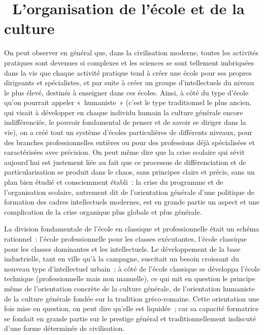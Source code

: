 \documentclass[french,twoside]{book} %
\begin{document}
\section[{ L'organisation de l’école et de la culture}]{ L'organisation de l’école et de la culture}
\noindent On peut observer en général que, dans la civilisation moderne, toutes les activités pratiques sont devenues si complexes et les sciences se sont tellement imbriquées dans la vie que chaque activité pratique tend à créer une école pour ses propres dirigeants et spécialistes, et par suite à créer un groupe d’intellectuels du niveau le plus élevé, destinés à enseigner dans ces écoles. Ainsi, à côté du type d’école qu’on pourrait appeler « humaniste » (c’est le type traditionnel le plus ancien, qui visait à développer en chaque individu humain la culture générale encore indifférenciée, le pouvoir fondamental de penser et de savoir se diriger dans la vie), on a créé tout un système d’écoles particulières de différents niveaux, pour des branches professionnelles entières ou pour des professions déjà spécialisées et caractérisées avec précision. On peut même dire que la crise scolaire qui sévit aujourd’hui est justement liée au fait que ce processus de différenciation et de particularisation se produit dans le chaos, sans principes clairs et précis, sans un plan bien étudié et consciemment établi : la crise du programme et de l’organisation scolaire, autrement dit de l’orientation générale d’une politique de formation des cadres intellectuels modernes, est en grande partie un aspect et une complication de la crise organique plus globale et plus générale.\par
La division fondamentale de l’école en classique et professionnelle était un schéma rationnel : l’école professionnelle pour les classes exécutantes, l’école classique pour les classes dominantes et les intellectuels. Le développement de la base industrielle, tant en ville qu’à la campagne, suscitait un besoin croissant du nouveau type d’intellectuel urbain ; à côté de l’école classique se développa l’école technique (professionnelle mais non manuelle), ce qui mit en question le principe même de l’orientation concrète de la culture générale, de l’orientation humaniste de la culture générale fondée sur la tradition gréco-romaine. Cette orientation une fois mise en question, on peut dire qu’elle est liquidée ; car sa capacité formatrice se fondait en grande partie sur le prestige général et traditionnellement indiscuté d’une forme déterminée de civilisation.\par
\end{document}

